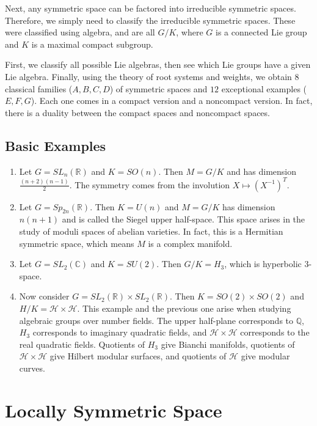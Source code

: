 \documentclass[leqno, openany]{memoir}
\theoremstyle{definition}
\theoremstyle{remark}
\theoremstyle{plain}
\theoremstyle{definition}
\theoremstyle{remark}
\newcommand{\R}{\mathbb{R}}
\newcommand{\C}{\mathbb{C}}
\newcommand{\Q}{\mathbb{Q}}
\newcommand{\mc}[1]{\mathcal{#1}}
\begin{document}
Next, any symmetric space can be factored into irreducible symmetric spaces. Therefore, we simply need to classify the irreducible symmetric spaces. These were classified using algebra, and are all $G/K$, where $G$ is a connected Lie group and $K$ is a maximal compact subgroup.

First, we classify all possible Lie algebras, then see which Lie groups have a given Lie algebra. Finally, using the theory of root systems and weights, we obtain $8$ classical families ($A,B,C,D$) of symmetric spaces and $12$ exceptional examples ($E,F,G$). Each one comes in a compact version and a noncompact version. In fact, there is a duality between the compact spaces and noncompact spaces.

\subsection{Basic Examples}%
\label{sub:basic_examples}

\begin{enumerate}
    \item Let $G = SL_n(\R)$ and $K = SO(n)$. Then $M = G/K$ and has dimension $\frac{(n+2)(n-1)}{2}$. The symmetry comes from the involution $X \mapsto (X^{-1})^T$.
    \item Let $G = Sp_{2n}(\R)$. Then $K = U(n)$ and $M = G/K$ has dimension $n(n+1)$ and is called the Siegel upper half-space. This space arises in the study of moduli spaces of abelian varieties. In fact, this is a Hermitian symmetric space, which means $M$ is a complex manifold.
    \item Let $G = SL_2(\C)$ and $K = SU(2)$. Then $G/K = H_3$, which is hyperbolic $3$-space.
    \item Now consider $G = SL_2(\R) \times SL_2(\R)$. Then $K = SO(2) \times SO(2)$ and $H/K = \mc{H} \times \mc{H}$. This example and the previous one arise when studying algebraic groups over number fields. The upper half-plane corresponds to $\Q$, $H_3$ corresponds to imaginary quadratic fields, and $\mc{H} \times \mc{H}$ corresponds to the real quadratic fields. Quotients of $H_3$ give Bianchi manifolds, quotients of $\mc{H} \times \mc{H}$ give Hilbert modular surfaces, and quotients of $\mc{H}$ give modular curves.
\end{enumerate}

\section{Locally Symmetric Space}%
\label{sec:locally_symmetric_space}
\end{document}
